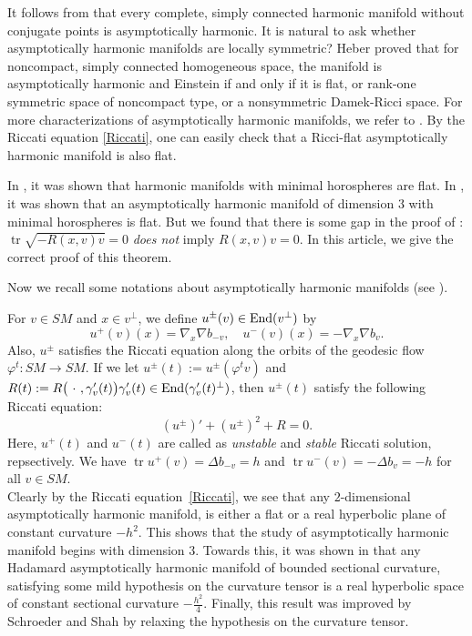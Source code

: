 \documentclass[12pt,a4paper]{amsart}
\theoremstyle{definition}
\theoremstyle{remark}
\newcommand{\tr}{\operatorname{tr}}
\newcommand \<{\langle}
\renewcommand \>{\rangle}
\begin{document}
It follows from \cite{RS1} that every complete, simply connected harmonic
manifold without conjugate points is asymptotically harmonic. It is natural to ask whether asymptotically harmonic manifolds are locally symmetric?  Heber \cite{He} proved that for noncompact, simply connected homogeneous space, the manifold is asymptotically harmonic and Einstein if and only if it is flat, or rank-one symmetric space of noncompact type, or a nonsymmetric Damek-Ricci space. For more characterizations of asymptotically harmonic manifolds, we refer to \cite{KP, Z}. {By the Riccati equation \eqref{Riccati}, one can easily check that a Ricci-flat asymptotically harmonic manifold is also flat.}

In \cite{RS}, it was shown that harmonic manifolds with minimal horospheres are flat.
In \cite{S2},  it was shown that an asymptotically harmonic manifold of dimension $3$ with minimal horospheres is flat.
But we found that there is some gap in the proof of \cite[Lemma 2.2]{S2}: $\tr\sqrt{-R(x,v)v}=0$ {\it does not} imply $R(x,v)v=0$.
In this article,  we give the correct proof of this theorem.

\vspace{0.15in}

Now we recall some notations about asymptotically harmonic manifolds (see \cite{H, S, S2}).

For $v\in SM$ and $x\in v^\perp$, we define $u^{\pm}(v)\in {\rm End}(v^\perp)$ by
\begin{equation*}
    u^+(v)(x)=\nabla_x \nabla b_{-v},\quad u^{-}(v)(x)=-\nabla_x\nabla b_{v}.
\end{equation*}
Also, $u^{\pm}$ satisfies the Riccati equation along the orbits of the geodesic flow $\varphi^t: SM\to SM$. If we let $u^{\pm}(t):=u^{\pm}(\varphi^t v)$ and $R(t):=R\big(~\cdot~, \gamma_v'(t)\big)\gamma_v'(t) \in {\rm End}(\gamma_v'(t)^\perp)$, then $u^{\pm}(t)$ satisfy the following Riccati equation:
\begin{equation}\label{Riccati}
    (u^{\pm})' + (u^{\pm})^2 + R = 0.
\end{equation}
Here, $u^{+}(t)$ and $u^{-}(t)$ are called as \emph{unstable} and \emph{stable} Riccati solution, repsectively.
We have $\tr u^+ (v) =\Delta b_{-v} = h$ and $\tr u^{-}(v) = -\Delta b_v = -h$ for all $v\in SM$. \\

Clearly by the Riccati equation~\eqref{Riccati}, we see that any $2$-dimensional asymptotically harmonic manifold,
is either a flat or a real hyperbolic plane of constant curvature $-h^2$.
This shows that the study of asymptotically harmonic manifold  {begins} with dimension $3$.
 Towards this, it was shown in  \cite{H} that any Hadamard
 asymptotically harmonic manifold of bounded sectional curvature, satisfying  {some} mild hypothesis
 on  {the}  curvature tensor is a real hyperbolic space of constant sectional curvature $-\frac{h^2}{4}$.
 Finally, this result was improved by Schroeder and Shah \cite{S} by relaxing the hypothesis on the curvature tensor.
\end{document}
